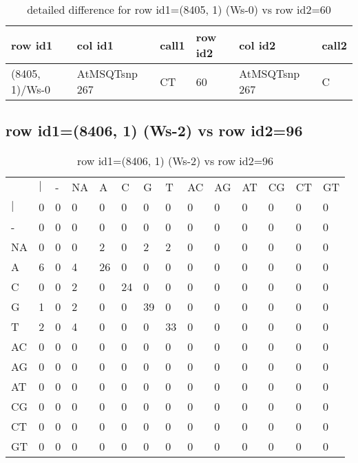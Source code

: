 \begin{center}
\begin{longtable}{|l|l|l|l|l|l|}
\caption{detailed difference for row id1=(8405, 1) (Ws-0) vs row id2=60} \label{table_dm667}\\
\hline
row id1&col id1&call1&row id2&col id2&call2\\
\hline
(8405, 1)/Ws-0&AtMSQTsnp 267&CT&60&AtMSQTsnp 267&C\\
\hline
\end{longtable}
\end{center}

\subsection{row id1=(8406, 1) (Ws-2) vs row id2=96}
\begin{center}
\begin{longtable}{|l|l|l|l|l|l|l|l|l|l|l|l|l|l|}
\caption{row id1=(8406, 1) (Ws-2) vs row id2=96} \label{table_dm668}\\
\hline
\\
\hline
&$|$&-&NA&A&C&G&T&AC&AG&AT&CG&CT&GT\\
$|$&0&0&0&0&0&0&0&0&0&0&0&0&0\\
-&0&0&0&0&0&0&0&0&0&0&0&0&0\\
NA&0&0&0&2&0&2&2&0&0&0&0&0&0\\
A&6&0&4&26&0&0&0&0&0&0&0&0&0\\
C&0&0&2&0&24&0&0&0&0&0&0&0&0\\
G&1&0&2&0&0&39&0&0&0&0&0&0&0\\
T&2&0&4&0&0&0&33&0&0&0&0&0&0\\
AC&0&0&0&0&0&0&0&0&0&0&0&0&0\\
AG&0&0&0&0&0&0&0&0&0&0&0&0&0\\
AT&0&0&0&0&0&0&0&0&0&0&0&0&0\\
CG&0&0&0&0&0&0&0&0&0&0&0&0&0\\
CT&0&0&0&0&0&0&0&0&0&0&0&0&0\\
GT&0&0&0&0&0&0&0&0&0&0&0&0&0\\
\hline
\end{longtable}
\end{center}

